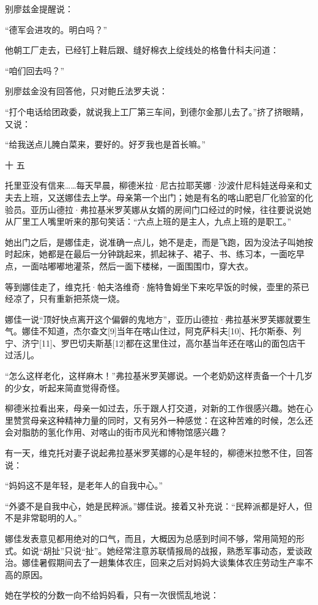 别廖兹金提醒说：

“德军会进攻的。明白吗？”

他朝工厂走去，已经钉上鞋后跟、缝好棉衣上绽线处的格鲁什科夫问道：

“咱们回去吗？”

别廖兹金没有回答他，只对鲍丘法罗夫说：

“打个电话给团政委，就说我上工厂第三车间，到德尔金那儿去了。”挤了挤眼睛，又说：

“给我送点儿腌白菜来，要好的。好歹我也是首长嘛。”

十 五

托里亚没有信来……每天早晨，柳德米拉·尼古拉耶芙娜·沙波什尼科娃送母亲和丈夫去上班，又送娜佳去上学。母亲第一个出门；她是有名的喀山肥皂厂化验室的化验员。亚历山德拉·弗拉基米罗芙娜从女婿的房间门口经过的时候，往往要说说她从厂里工人嘴里听来的那句笑话：“六点上班的是主人，九点上班的是职工。”

她出门之后，是娜佳走，说准确一点儿，她不是走，而是飞跑，因为没法子叫她按时起床，她都是在最后一分钟跳起来，抓起袜子、裙子、书、练习本，一面吃早点，一面咕嘟嘟地灌茶，然后一面下楼梯，一面围围巾，穿大衣。

等到娜佳走了，维克托·帕夫洛维奇·施特鲁姆坐下来吃早饭的时候，壶里的茶已经凉了，只有重新把茶烧一烧。

娜佳一说“顶好快点离开这个偏僻的鬼地方”，亚历山德拉·弗拉基米罗芙娜就要生气。娜佳不知道，杰尔查文[9]当年在喀山住过，阿克萨科夫[10]、托尔斯泰、列宁、济宁[11]、罗巴切夫斯基[12]都在这里住过，高尔基当年还在喀山的面包店干过活儿。

“怎么这样老化，这样麻木！”弗拉基米罗芙娜说。一个老奶奶这样责备一个十几岁的少女，听起来简直觉得奇怪。

柳德米拉看出来，母亲一如过去，乐于跟人打交道，对新的工作很感兴趣。她在心里赞赏母亲这种精神力量的同时，又有另外一种感觉：在这种苦难的时候，怎么还会对脂肪的氢化作用、对喀山的街市风光和博物馆感兴趣？

有一天，维克托对妻子说起弗拉基米罗芙娜的心是年轻的，柳德米拉憋不住，回答说：

“妈妈这不是年轻，是老年人的自我中心。”

“外婆不是自我中心，她是民粹派。”娜佳说。接着又补充说：“民粹派都是好人，但不是非常聪明的人。”

娜佳发表意见都用绝对的口气，而且，大概因为总感到时间不够，常用简短的形式。如说“胡扯”只说“扯”。她经常注意苏联情报局的战报，熟悉军事动态，爱谈政治。娜佳暑假期间去了一趟集体农庄，回来之后对妈妈大谈集体农庄劳动生产率不高的原因。

她在学校的分数一向不给妈妈看，只有一次很慌乱地说：

